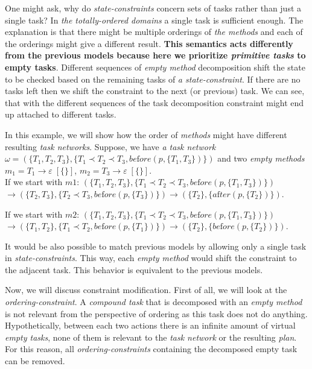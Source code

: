 \medskip\noindent
One might ask, why do \emph{state-constraints} concern sets of tasks rather than just a single task? In \emph{the totally-ordered domains} a single task is sufficient enough. The explanation is that there might be multiple orderings of \emph{the methods} and each of the orderings might give a different result. \textbf{This semantics acts differently from the previous models because here we prioritize \emph{primitive tasks} to empty tasks}. Different sequences of \emph{empty method} decomposition shift the state to be checked based on the remaining tasks of \emph{a state-constraint}. If there are no tasks left then we shift the constraint to the next (or previous) task. We can see, that with the different sequences of the task decomposition constraint might end up attached to different tasks.

\begin{example}\label{ex03:7}
    In this example, we will show how the order of \emph{methods} might have different resulting \emph{task networks}. Suppose, we have \emph{a task network} $\omega = (\{T_1, T_2, T_3\}, \{T_1 \prec T_2 \prec T_3, be\text{f}ore(p, \{T_1, T_3\})\})$ and two \emph{empty methods} $m_1 = T_1 \rightarrow \varepsilon \; [\{\}]$, $m_2 = T_3 \rightarrow \varepsilon \; [\{\}]$. \\

    If we start with $m1$: $(\{T_1, T_2, T_3\}, \{T_1 \prec T_2 \prec T_3, be\text{f}ore(p, \{T_1, T_3\})\})$ $\rightarrow (\{T_2, T_3\}, \{T_2 \prec T_3, be\text{f}ore(p, \{T_3\})\}) \rightarrow (\{T_2\}, \{a\text{f}ter(p, \{T_2\})\})$.

    If we start with $m2$: $(\{T_1, T_2, T_3\}, \{T_1 \prec T_2 \prec T_3, be\text{f}ore(p, \{T_1, T_3\})\})$ $\rightarrow (\{T_1, T_2\}, \{T_1 \prec T_2, be\text{f}ore(p, \{T_1\})\}) \rightarrow (\{T_2\}, \{be\text{f}ore(p, \{T_2\})\})$.
\end{example}

\medskip\noindent
It would be also possible to match previous models by allowing only a single task in \emph{state-constraints}. This way, each \emph{empty method} would shift the constraint to the adjacent task. This behavior is equivalent to the previous models.

\medskip\noindent 
Now, we will discuss constraint modification. First of all, we will look at the \emph{ordering-constraint}. A \emph{compound task} that is decomposed with an \emph{empty method} is not relevant from the perspective of ordering as this task does not do anything. Hypothetically, between each two actions there is an infinite amount of virtual \emph{empty tasks}, none of them is relevant to the \emph{task network} or the resulting \emph{plan}. For this reason, all \emph{ordering-constraints} containing the decomposed empty task can be removed. 

